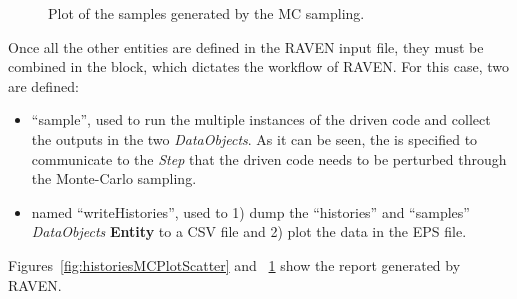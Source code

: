\begin{enumerate}
\begin{figure}[h!]
  \caption{Plot of the samples generated by the MC sampling.}
  \label{fig:samplesMCPlotScatter}
 \end{figure}
   Once all the other entities are defined in the RAVEN input file, they must be combined in the
    block, which dictates the workflow of RAVEN.  For this case,
   two  are defined:
   \begin{itemize}
     \item {} ``sample'', used to run the multiple
     instances of the driven code and
     collect the outputs in the two \textit{DataObjects}. As it can be
     seen, the  is specified to communicate to the
     \textit{Step} that the driven code needs to
     be perturbed through the Monte-Carlo sampling.
     \item  {} named ``writeHistories'', used to 1) dump
     the ``histories'' and ``samples'' \textit{DataObjects}
     \textbf{Entity} to a CSV file and 2) plot the data in the EPS file.
   \end{itemize}
\end{enumerate}
 Figures~\ref{fig:historiesMCPlotScatter} and ~\ref{fig:samplesMCPlotScatter} show the report
 generated by RAVEN.
